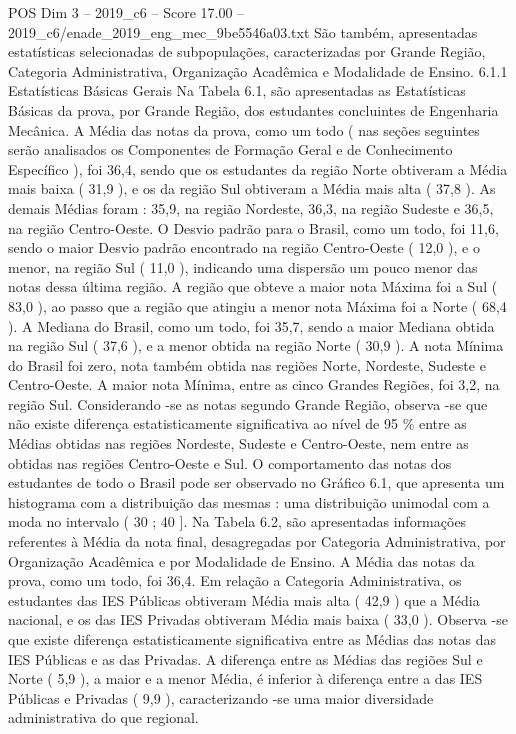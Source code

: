 \begin{textsample}{POS Dim 3 – 2019\_c6 – Score 17.00 – 2019\_c6/enade\_2019\_eng\_mec\_9be5546a03.txt}
São também, apresentadas estatísticas selecionadas de subpopulações, caracterizadas por Grande Região, Categoria Administrativa, Organização Acadêmica e Modalidade de Ensino. 6.1.1 Estatísticas Básicas Gerais Na Tabela 6.1, são apresentadas as Estatísticas Básicas da prova, por Grande Região, dos estudantes concluintes de Engenharia Mecânica.
A Média das notas da prova, como um todo ( nas seções seguintes serão analisados os Componentes de Formação Geral e de Conhecimento Específico ), foi 36,4, sendo que os estudantes da região Norte obtiveram a Média mais baixa ( 31,9 ), e os da região Sul obtiveram a Média mais alta ( 37,8 ).
As demais Médias foram : 35,9, na região Nordeste, 36,3, na região Sudeste e 36,5, na região Centro-Oeste.
O Desvio padrão para o Brasil, como um todo, foi 11,6, sendo o maior Desvio padrão encontrado na região Centro-Oeste ( 12,0 ), e o menor, na região Sul ( 11,0 ), indicando uma dispersão um pouco menor das notas dessa última região.
A região que obteve a maior nota Máxima foi a Sul ( 83,0 ), ao passo que a região que atingiu a menor nota Máxima foi a Norte ( 68,4 ).
A Mediana do Brasil, como um todo, foi 35,7, sendo a maior Mediana obtida na região Sul ( 37,6 ), e a menor obtida na região Norte ( 30,9 ).
A nota Mínima do Brasil foi zero, nota também obtida nas regiões Norte, Nordeste, Sudeste e Centro-Oeste.
A maior nota Mínima, entre as cinco Grandes Regiões, foi 3,2, na região Sul.
Considerando -se as notas segundo Grande Região, observa -se que não existe diferença estatisticamente significativa ao nível de 95 \% entre as Médias obtidas nas regiões Nordeste, Sudeste e Centro-Oeste, nem entre as obtidas nas regiões Centro-Oeste e Sul.
O comportamento das notas dos estudantes de todo o Brasil pode ser observado no Gráfico 6.1, que apresenta um histograma com a distribuição das mesmas : uma distribuição unimodal com a moda no intervalo ( 30 ; 40 ].
Na Tabela 6.2, são apresentadas informações referentes à Média da nota final, desagregadas por Categoria Administrativa, por Organização Acadêmica e por Modalidade de Ensino.
A Média das notas da prova, como um todo, foi 36,4.
Em relação a Categoria Administrativa, os estudantes das IES Públicas obtiveram Média mais alta ( 42,9 ) que a Média nacional, e os das IES Privadas obtiveram Média mais baixa ( 33,0 ).
Observa -se que existe diferença estatisticamente significativa entre as Médias das notas das IES Públicas e as das Privadas.
A diferença entre as Médias das regiões Sul e Norte ( 5,9 ), a maior e a menor Média, é inferior à diferença entre a das IES Públicas e Privadas ( 9,9 ), caracterizando -se uma maior diversidade administrativa do que regional.

\end{textsample}
